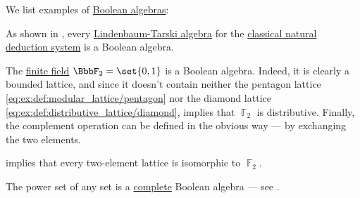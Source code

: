 \begin{example}\label{ex:def:boolean_algebra}
  We list examples of \hyperref[def:boolean_algebra]{Boolean algebras}:

  \begin{thmenum}
     As shown in , every \hyperref[def:lindenbaum_tarski_algebra]{Lindenbaum-Tarski algebra} for the \hyperref[def:propositional_natural_deduction_systems]{classical natural deduction system} is a Boolean algebra.

     The \hyperref[def:finite_field]{finite field} \( \BbbF_2 = \set{ 0, 1 } \) is a Boolean algebra. Indeed, it is clearly a bounded lattice, and since it doesn't contain neither the pentagon lattice \eqref{eq:ex:def:modular_lattice/pentagon} nor the diamond lattice \eqref{eq:ex:def:distributive_lattice/diamond},  implies that \( \BbbF_2 \) is distributive. Finally, the complement operation can be defined in the obvious way --- by exchanging the two elements.

     implies that every two-element lattice is isomorphic to \( \BbbF_2 \).

     The power set of any set is a \hyperref[def:complete_lattice]{complete} Boolean algebra --- see .
  \end{thmenum}
\end{example}

